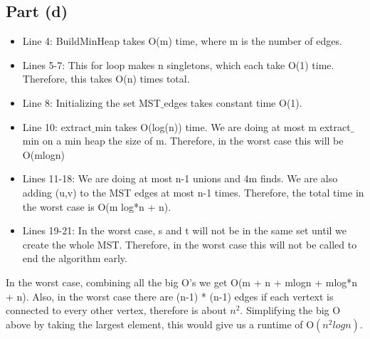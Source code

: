 \documentclass{article}
\begin{document}
\subsection*{Part (d)}
\begin{itemize}
    \item Line 4: BuildMinHeap takes O(m) time, where m is the number of edges.
    \item Lines 5-7: This for loop makes n singletons, which each take O(1) time. Therefore, this takes O(n) times total.
    \item Line 8: Initializing the set MST$\_$edges takes constant time O(1).
    \item Line 10: extract$\_$min takes O(log(n)) time. We are doing at most m extract$\_$min on a min heap the size of m. Therefore, in the worst case this will be O(mlogn)
    \item Lines 11-18: We are doing at most n-1 unions and 4m finds. We are also adding (u,v) to the MST edges at most n-1 times. Therefore, the total time in the worst case is O(m log*n + n).
    \item Lines 19-21: In the worst case, s and t will not be in the same set until we create the whole MST. Therefore, in the worst case this will not be called to end the algorithm early. 
\end{itemize}
In the worst case, combining all the big O's we get O(m + n + mlogn + mlog*n + n). Also, in the worst case there are (n-1) * (n-1) edges if each vertext is connected to every other vertex, therefore is about $n^{2}$. Simplifying the big O above by taking the largest element, this would give us a runtime of O$(n^{2}logn)$.
\end{document}
